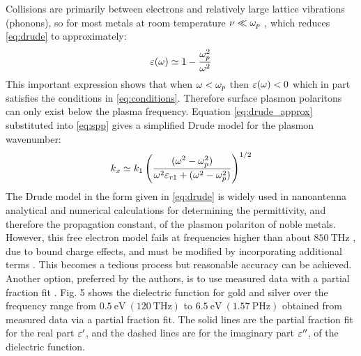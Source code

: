 \documentclass[11pt]{article}
\begin{document}
Collisions are primarily between electrons and relatively large lattice vibrations (phonons), so for most metals at room temperature  $\nu \ll \omega_p $ \cite{Bohren1998}, which reduces \eqref{eq:drude} to approximately:
%
\begin{equation}
  \varepsilon(\omega) \simeq 1 - \frac{\omega_p^2}{\omega^2}
  \label{eq:drude_approx}
\end{equation}
%
This important expression shows that when $\omega < \omega_p$ then $\varepsilon(\omega) < 0$  which in part satisfies the conditions in \eqref{eq:conditions}. Therefore surface plasmon polaritons can only exist below the plasma frequency. Equation \eqref{eq:drude_approx} substituted into \eqref{eq:spp} gives a simplified Drude model for the plasmon wavenumber:
%
\begin{equation}
  k_x \simeq k_1 \left( \frac{(\omega^2 - \omega_p^2)}{\omega^2 \varepsilon_{r1} + (\omega^2 - \omega_p^2)} \right)^{1/2}
  \label{eq:kx_approx}
\end{equation}
%
The Drude model in the form given in \eqref{eq:drude} is widely used in nanoantenna analytical and numerical calculations for determining the permittivity, and therefore the propagation constant, of the plasmon polariton of noble metals. However, this free electron model fails at frequencies higher than about $850~\mathrm{THz}$ \cite{Archambault2009}, due to bound charge effects, and must be modified by incorporating additional terms \cite{Bohren1998}. This becomes a tedious process but reasonable accuracy can be achieved. Another option, preferred by the authors, is to use measured data \cite{Lynch1997} with a partial fraction fit \cite{Michalski2013}. Fig. 5 shows the dielectric function for gold and silver over the frequency range from $0.5~\mathrm{eV}~(120~\mathrm{THz})$ to $6.5~\mathrm{eV}~(1.57~\mathrm{PHz})$ obtained from measured data via a partial fraction fit. The solid lines are the partial fraction fit for the real part $\varepsilon'$, and the dashed lines are for the imaginary part
$\varepsilon''$, of the dielectric function.

\end{document}
